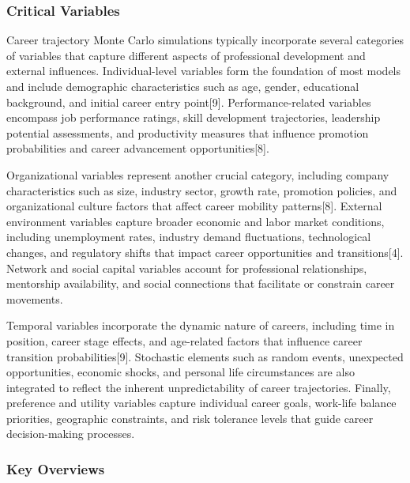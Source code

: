 \documentclass[main.tex]{subfiles}
\begin{document}
\subsubsection{Critical Variables}

Career trajectory Monte Carlo simulations typically incorporate several categories of variables that capture different aspects of professional development and external influences. Individual-level variables form the foundation of most models and include demographic characteristics such as age, gender, educational background, and initial career entry point[9]. Performance-related variables encompass job performance ratings, skill development trajectories, leadership potential assessments, and productivity measures that influence promotion probabilities and career advancement opportunities[8].

Organizational variables represent another crucial category, including company characteristics such as size, industry sector, growth rate, promotion policies, and organizational culture factors that affect career mobility patterns[8]. External environment variables capture broader economic and labor market conditions, including unemployment rates, industry demand fluctuations, technological changes, and regulatory shifts that impact career opportunities and transitions[4]. Network and social capital variables account for professional relationships, mentorship availability, and social connections that facilitate or constrain career movements.

Temporal variables incorporate the dynamic nature of careers, including time in position, career stage effects, and age-related factors that influence career transition probabilities[9]. Stochastic elements such as random events, unexpected opportunities, economic shocks, and personal life circumstances are also integrated to reflect the inherent unpredictability of career trajectories. Finally, preference and utility variables capture individual career goals, work-life balance priorities, geographic constraints, and risk tolerance levels that guide career decision-making processes.

\subsubsection{Key Overviews}

\end{document}
